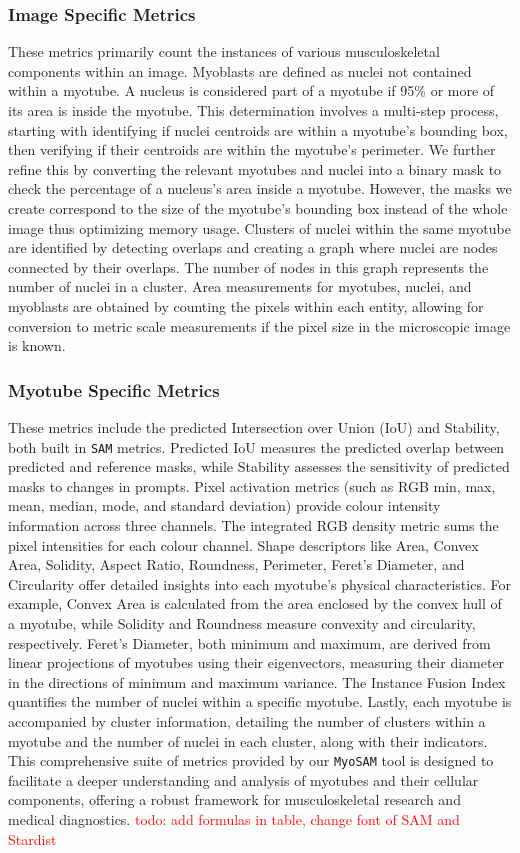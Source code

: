 \subsubsection{Image Specific Metrics}
These metrics primarily count the instances of various musculoskeletal components within an image. Myoblasts are defined as nuclei not contained within a myotube. A nucleus is considered part of a myotube if 95\% or more of its area is inside the myotube. This determination involves a multi-step process, starting with identifying if nuclei centroids are within a myotube's bounding box, then verifying if their centroids are within the myotube's perimeter. We further refine this by converting the relevant myotubes and nuclei into a binary mask to check the percentage of a nucleus's area inside a myotube. However, the masks we create correspond to the size of the myotube’s bounding box instead of the whole image thus optimizing memory usage. Clusters of nuclei within the same myotube are identified by detecting overlaps and creating a graph where nuclei are nodes connected by their overlaps. The number of nodes in this graph represents the number of nuclei in a cluster. Area measurements for myotubes, nuclei, and myoblasts are obtained by counting the pixels within each entity, allowing for conversion to metric scale measurements if the pixel size in the microscopic image is known.
\subsubsection{Myotube Specific Metrics}
These metrics include the predicted Intersection over Union (IoU) and Stability, both built in \texttt{SAM} metrics. Predicted IoU measures the predicted overlap between predicted and reference masks, while Stability assesses the sensitivity of predicted masks to changes in prompts. Pixel activation metrics (such as RGB min, max, mean, median, mode, and standard deviation) provide colour intensity information across three channels. The integrated RGB density metric sums the pixel intensities for each colour channel. Shape descriptors like Area, Convex Area, Solidity, Aspect Ratio, Roundness, Perimeter, Feret’s Diameter, and Circularity offer detailed insights into each myotube's physical characteristics. For example, Convex Area is calculated from the area enclosed by the convex hull of a myotube, while Solidity and Roundness measure convexity and circularity, respectively. Feret's Diameter, both minimum and maximum, are derived from linear projections of myotubes using their eigenvectors, measuring their diameter in the directions of minimum and maximum variance. The Instance Fusion Index quantifies the number of nuclei within a specific myotube. Lastly, each myotube is accompanied by cluster information, detailing the number of clusters within a myotube and the number of nuclei in each cluster, along with their indicators.
This comprehensive suite of metrics provided by our \texttt{MyoSAM} tool is designed to facilitate a deeper understanding and analysis of myotubes and their cellular components, offering a robust framework for musculoskeletal research and medical diagnostics.
\textcolor{red}{todo: add formulas in table, change font of SAM and Stardist}


